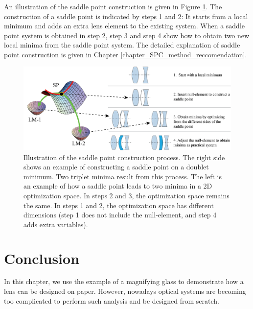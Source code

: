 An illustration of the saddle point construction is given in Figure \ref{fig: spc_illustration}. The construction of a saddle point is indicated by steps 1 and 2: It starts from a local minimum and adds an extra lens element to the existing system. When a saddle point system is obtained in step 2, step 3 and step 4 show how to obtain two new local minima from the saddle point system. The detailed explanation of saddle point construction is given in Chapter \ref{chapter_SPC_method_reccomendation}. 

\begin{figure}[h]
    \centering
    \includegraphics[scale=0.58]{chapter-1/figures/spc_illustrate.png}
    \caption{Illustration of the saddle point construction process. The right side shows an example of constructing a saddle point on a doublet minimum. Two triplet minima result from this process. The left is an example of how a saddle point leads to two minima in a 2D optimization space. In steps 2 and 3, the optimization space remains the same. In steps 1 and 2, the optimization space has different dimensions (step 1 does not include the null-element, and step 4 adds extra variables). }
    \label{fig: spc_illustration}
\end{figure} 



\newpage
\section{Conclusion}
In this chapter, we use the example of a magnifying glass to demonstrate how a lens can be designed on paper. However, nowadays optical systems are becoming too complicated to perform such analysis and be designed from scratch. 

